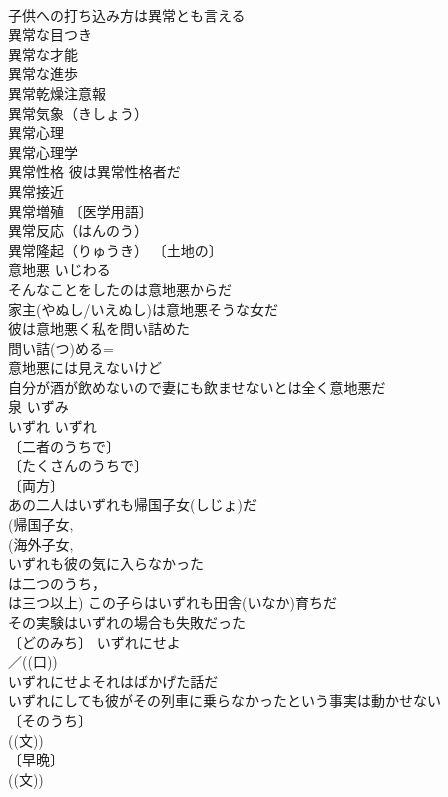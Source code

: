 \documentclass[8pt]{extreport}
\begin{document}
\begin{CJK}{UTF8}{min}
\\	子供への打ち込み方は異常とも言える 
\\	異常な目つき 
\\	異常な才能 
\\	異常な進歩 
\\	異常乾燥注意報 
\\	異常気象（きしょう） 
\\	異常心理 
\\	異常心理学 
\\	異常性格 彼は異常性格者だ 
\\	異常接近 
\\	異常増殖 〔医学用語〕
\\	異常反応（はんのう） 
\\	異常隆起（りゅうき） 〔土地の〕
\\	意地悪	いじわる	
\\	そんなことをしたのは意地悪からだ 
\\	家主(やぬし/いえぬし)は意地悪そうな女だ 
\\	彼は意地悪く私を問い詰めた 
\\	問い詰(つ)める=
\\	意地悪には見えないけど 
\\	自分が酒が飲めないので妻にも飲ませないとは全く意地悪だ 
\\	泉	いずみ	
\\	いずれ	いずれ	
\\	〔二者のうちで〕
\\	〔たくさんのうちで〕
\\	〔両方〕
\\	あの二人はいずれも帰国子女(しじょ)だ 
\\	(帰国子女, 
\\	(海外子女, 
\\	いずれも彼の気に入らなかった 
\\	は二つのうち，
\\	は三つ以上) この子らはいずれも田舎(いなか)育ちだ 
\\	その実験はいずれの場合も失敗だった 
\\	〔どのみち〕 いずれにせよ 
\\	／((口)) 
\\	いずれにせよそれはばかげた話だ 
\\	いずれにしても彼がその列車に乗らなかったという事実は動かせない 
\\	〔そのうち〕
\\	((文)) 
\\	〔早晩〕
\\	((文)) 

\end{CJK}
\end{document}
